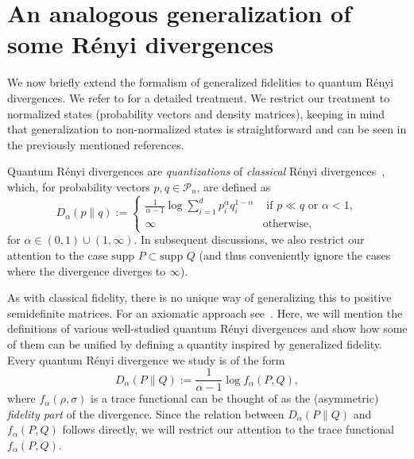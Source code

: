 \documentclass[12pt]{article}
\theoremstyle{definition}
\begin{document}
  

\section{An analogous generalization of some R\'enyi divergences } \label{Sec:Divergence}
We now briefly extend the formalism of generalized fidelities to quantum R\'enyi divergences. We refer to \cite{audenaert2013alpha, tomamichel2015quantum, muller2013quantum} for a detailed treatment. We restrict our treatment to normalized states (probability vectors and density matrices), keeping in mind that generalization to non-normalized states is straightforward and can be seen in the previously mentioned references. 

Quantum R\'enyi divergences are \textit{quantizations} of \textit{classical} R\'enyi divergences~\cite{renyi1961entropy, van2014renyi}, which, for probability vectors $p, q \in \mathcal P_n$, are defined as
\begin{equation}
    D_{\alpha} (p\|q) := \begin{cases}
        \frac1{\alpha-1} \log \sum_{i=1}^{d} p_i^\alpha q_i^{1-\alpha}  & \text{ if } p \ll q \text{ or } \alpha < 1,    \\
        \infty & \text{otherwise},
    \end{cases}
\end{equation}
for $\alpha \in (0, 1) \cup (1, \infty)$.  In subsequent discussions, we also restrict our attention to the case $\text{supp } P \subset \text{supp } Q$ (and thus conveniently ignore the cases where the divergence diverges to $\infty$). 


As with classical fidelity, there is no unique way of generalizing this to positive semidefinite matrices. For an axiomatic approach see~\cite{audenaert2013alpha, tomamichel2015quantum, muller2013quantum}. Here, we will mention the definitions of various well-studied quantum R\'enyi divergences and show how some of them can be unified by defining a quantity inspired by generalized fidelity. Every quantum R\'enyi divergence we study is of the form
\begin{equation}
    D_{\alpha}(P \| Q) := \frac1{\alpha - 1} \log f_\alpha(P, Q),
\end{equation}
where $f_\alpha(\rho, \sigma)$ is a trace functional can be thought of as the (asymmetric) \textit{fidelity part} of the divergence. Since the relation between $D_\alpha(P\|Q)$ and $f_\alpha(P,Q)$ follows directly, we will restrict our attention to the trace functional $f_\alpha(P,Q)$.
\end{document}
